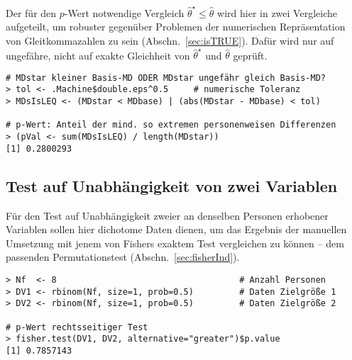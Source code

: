 Der für den $p$-Wert notwendige Vergleich $\hat{\theta}^{\star} \leq \hat{\theta}$ wird hier in zwei Vergleiche aufgeteilt, um robuster gegenüber Problemen der numerischen Repräsentation von Gleitkommazahlen zu sein (Abschn.\ \ref{sec:isTRUE}). Dafür wird nur auf ungefähre, nicht auf exakte Gleichheit von $\hat{\theta}^{\star}$ und $\hat{\theta}$ geprüft.
\begin{lstlisting}
# MDstar kleiner Basis-MD ODER MDstar ungefähr gleich Basis-MD?
> tol <- .Machine$double.eps^0.5     # numerische Toleranz
> MDsIsLEQ <- (MDstar < MDbase) | (abs(MDstar - MDbase) < tol)

# p-Wert: Anteil der mind. so extremen personenweisen Differenzen
> (pVal <- sum(MDsIsLEQ) / length(MDstar))
[1] 0.2800293
\end{lstlisting}

\subsection{Test auf Unabhängigkeit von zwei Variablen}

Für den Test auf Unabhängigkeit zweier an denselben Personen erhobener Variablen sollen hier dichotome Daten dienen, um das Ergebnis der manuellen Umsetzung mit jenem von Fishers exaktem Test vergleichen zu können -- dem passenden Permutationstest (Abschn.\ \ref{sec:fisherInd}).
\begin{lstlisting}
> Nf  <- 8                                    # Anzahl Personen
> DV1 <- rbinom(Nf, size=1, prob=0.5)         # Daten Zielgröße 1
> DV2 <- rbinom(Nf, size=1, prob=0.5)         # Daten Zielgröße 2

# p-Wert rechtsseitiger Test
> fisher.test(DV1, DV2, alternative="greater")$p.value
[1] 0.7857143
\end{lstlisting}

